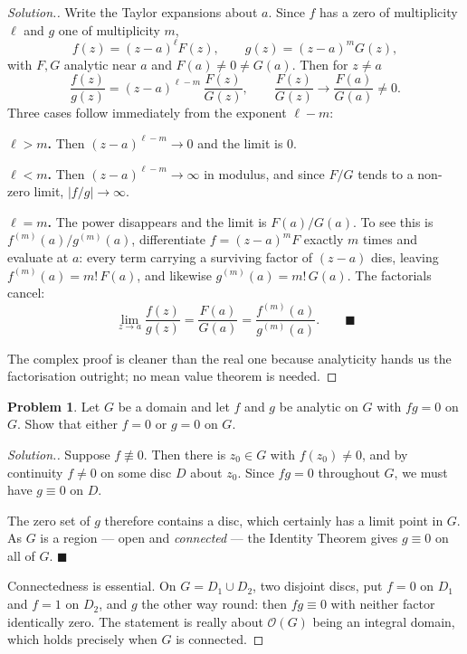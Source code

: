 \documentclass[11pt,a4paper]{article}
\theoremstyle{definition}
\newtheorem{problemx}{Problem}[section]
\newenvironment{problem}{\begin{problemx}}{\end{problemx}}
\newenvironment{solution}
  {\renewcommand{\qedsymbol}{}\begin{proof}[\textit{Solution}.]}
  {\end{proof}}
\begin{document}
\begin{solution}
Write the Taylor expansions about $a$. Since $f$ has a zero of multiplicity
$\ell$ and $g$ one of multiplicity $m$,
$$f(z) = (z-a)^{\ell}F(z),\qquad g(z) = (z-a)^{m}G(z),$$
with $F, G$ analytic near $a$ and $F(a) \neq 0 \neq G(a)$. Then for $z \neq a$
$$\frac{f(z)}{g(z)} = (z-a)^{\ell-m}\,\frac{F(z)}{G(z)},
\qquad \frac{F(z)}{G(z)} \longrightarrow \frac{F(a)}{G(a)} \neq 0 .$$
Three cases follow immediately from the exponent $\ell - m$:

\textbf{$\ell > m$.} Then $(z-a)^{\ell-m} \rightarrow 0$ and the limit is $0$.

\textbf{$\ell < m$.} Then $(z-a)^{\ell-m} \rightarrow \infty$ in modulus, and since
$F/G$ tends to a non-zero limit, $\left|f/g\right| \rightarrow \infty$.

\textbf{$\ell = m$.} The power disappears and the limit is $F(a)/G(a)$. To see this
is $f^{(m)}(a)/g^{(m)}(a)$, differentiate $f = (z-a)^{m}F$ exactly $m$ times and
evaluate at $a$: every term carrying a surviving factor of $(z-a)$ dies, leaving
$f^{(m)}(a) = m!\,F(a)$, and likewise $g^{(m)}(a) = m!\,G(a)$. The factorials
cancel:
$$\lim_{z\to a}\frac{f(z)}{g(z)} = \frac{F(a)}{G(a)}
= \frac{f^{(m)}(a)}{g^{(m)}(a)} . \qquad \blacksquare$$

The complex proof is cleaner than the real one because analyticity hands us the
factorisation outright; no mean value theorem is needed.
\end{solution}


\begin{problem}
Let $G$ be a domain and let $f$ and $g$ be analytic on $G$ with $fg = 0$ on $G$.
Show that either $f = 0$ or $g = 0$ on $G$.
\end{problem}

\begin{solution}
Suppose $f \not\equiv 0$. Then there is $z_0 \in G$ with $f(z_0) \neq 0$, and by
continuity $f \neq 0$ on some disc $D$ about $z_0$. Since $fg = 0$ throughout $G$,
we must have $g \equiv 0$ on $D$.

The zero set of $g$ therefore contains a disc, which certainly has a limit point in
$G$. As $G$ is a region --- open and \emph{connected} --- the Identity Theorem gives
$g \equiv 0$ on all of $G$. $\blacksquare$

Connectedness is essential. On $G = D_1 \cup D_2$, two disjoint discs, put $f = 0$
on $D_1$ and $f = 1$ on $D_2$, and $g$ the other way round: then $fg \equiv 0$ with
neither factor identically zero. The statement is really about $\mathcal{O}(G)$
being an integral domain, which holds precisely when $G$ is connected.
\end{solution}
\end{document}
